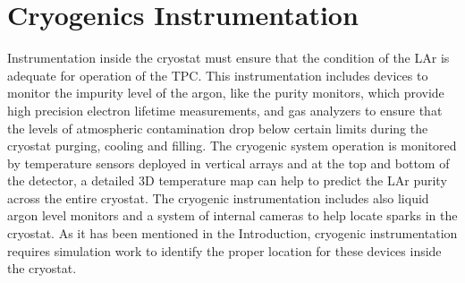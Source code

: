 \section{Cryogenics Instrumentation}
\label{sec:fdsp-cryo-instr}
\label{sec:fdgen-cryo-instr} %

Instrumentation inside the cryostat must ensure that the condition of the LAr is adequate for operation of the TPC. This instrumentation includes devices to monitor the impurity level of the argon, like the purity monitors, which provide high precision electron lifetime measurements,
and gas analyzers to ensure that the levels of atmospheric contamination drop below certain limits during the cryostat purging, cooling and filling.
The cryogenic system operation is monitored by temperature sensors deployed in vertical arrays and at the top and bottom of the detector, a detailed 3D temperature map can help to predict the LAr purity across the entire cryostat. The cryogenic instrumentation includes also liquid argon level monitors and
a system of internal cameras to help locate sparks in the cryostat.
As it has been mentioned in the Introduction, cryogenic instrumentation requires simulation work to identify the proper location for these devices inside the cryostat.



